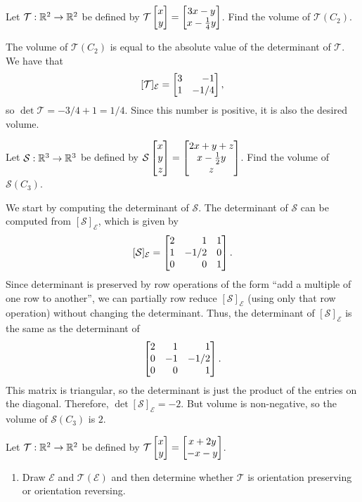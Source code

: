 \begin{exercises}
	\begin{problist}
		\prob Let $\mathcal{T}:\mathbb{R}^{2}\to\mathbb{R}^{2}$ be defined by $\mathcal{T}\mat{x\\y}
		=\matc{3x-y\\x-\tfrac{1}{4}y}$. Find the volume of $\mathcal{T}(C_{2})$.
		\begin{solution}
			The volume of $\mathcal T(C_{2})$ is equal to the absolute value of the
			determinant of $\mathcal T$. We have that
			\[
				[\mathcal T]_{\mathcal E} =
				\mat{
					3 & - 1  \\
					1 & -1/4
				},
			\] so $\det \mathcal T = -3/4 + 1 = 1/4$. Since this number is positive, it is also the desired volume.
		\end{solution}

		\prob Let $\mathcal{S}:\mathbb{R}^{3}\to\mathbb{R}^{3}$ be defined by
		$\mathcal{S}\mat{x\\y\\z}=\matc{2x+y+z\\x-\tfrac{1}{2}y\\z}$. Find the volume
		of $\mathcal{S}(C_{3})$.
		\begin{solution}
			We start by computing the determinant of $\mathcal S$.
			The determinant of $\mathcal S$ can be computed from $[\mathcal S]_{\mathcal E}$, which is
			given by
			\[
				[\mathcal S]_{\mathcal E} =
				\mat{
					2 & 1    & 1 \\
					1 & -1/2 & 0 \\
					0 & 0    & 1
				}.
			\] Since determinant is preserved by row operations of the form ``add a multiple of
			one row to another'', we can partially row reduce $[\mathcal S]_{\mathcal E}$ (using
			only that row operation) without changing the determinant. Thus, the determinant
			of $[\mathcal S]_{\mathcal E}$ is the same as the determinant of
			\[
				\mat{
					2 & 1  & 1    \\
					0 & -1 & -1/2 \\
					0 & 0  & 1
				}.
			\]
			This matrix is triangular, so the determinant is just the product of the
			entries on the diagonal. Therefore, $\det [\mathcal S]_{\mathcal E} = -2$. But volume is non-negative,
			so the volume of $\mathcal S(C_3)$ is $2$.
		\end{solution}

		\prob Let $\mathcal{T}:\mathbb{R}^{2}\to\mathbb{R}^{2}$ be defined by $\mathcal{T}\mat{x\\y}
		=\matc{x+2y\\-x-y}$.
		\begin{enumerate}
			\item Draw $\mathcal{E}$ and $\mathcal{T}(\mathcal{E})$ and then determine
				whether $\mathcal{T}$ is orientation preserving or orientation reversing.


\end{enumerate}
\end{problist}
\end{exercises}
